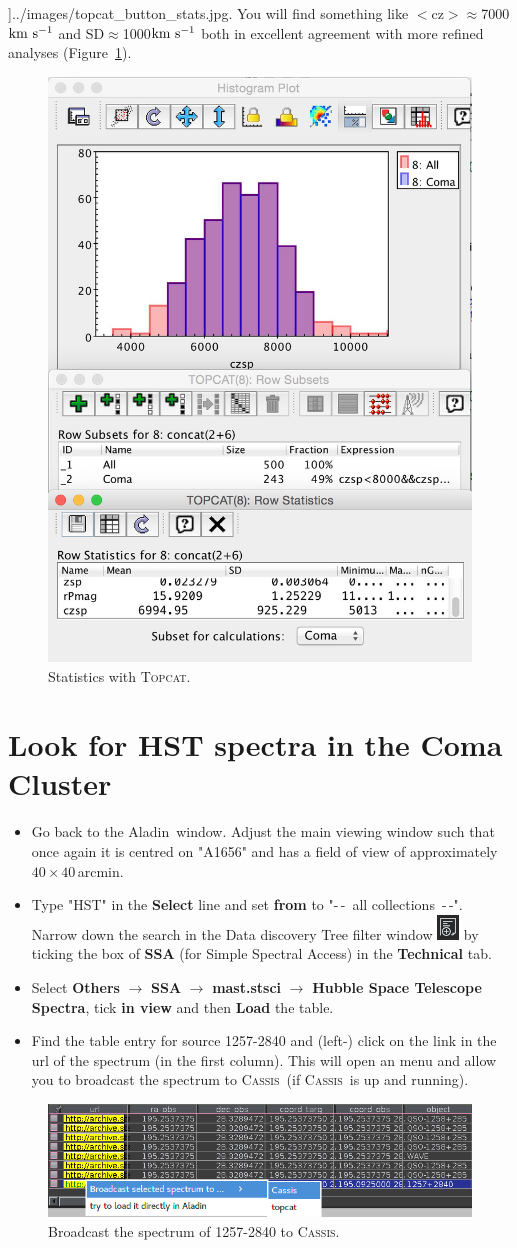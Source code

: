 \documentclass [a4paper, 12pt]{article}
\def\kms{\rm km\ s^{-1}}
\newcommand{\aladin}{{\textsc{A}{ladin}}}
\newcommand{\topcat}{{\textsc{Topcat}}}
\newcommand{\cassis}{{\textsc{Cassis}}}
\begin{document}
\begin{itemize}
\textwidth]{../images/topcat_button_stats.jpg}. You will find something like 
$<$cz$>\approx$7000$\kms$ and SD$\approx$1000$\kms$ both in excellent agreement 
with more refined analyses (Figure~\ref{fig:topstats}). 
\begin{figure}[H]
\center
\includegraphics[width=0.33  \textwidth]{../images/topcat_hist-stat_coma.jpg}
\caption{Statistics with \topcat.}
\label{fig:topstats}
\end{figure}
\end{itemize}

\section{Look for HST spectra in the Coma Cluster}

\begin{itemize}
\item Go back to the \aladin\ window. Adjust the main viewing window such that 
once again it is centred on "A1656" and has a field of view of approximately 
$40\times40$\,arcmin. 
\item Type "HST" in the \textbf{Select} line and set \textbf{from} to "-\,-~all 
collections~-\,-". Narrow down the search in the Data discovery Tree filter 
window \includegraphics[width=0.03 
\textwidth]{../images/aladin_button_filtertree.png} by ticking the box of 
\textbf{SSA} (for Simple Spectral Access) in the \textbf{Technical} tab. 
\item Select \textbf{Others} $\rightarrow$ \textbf{SSA} $\rightarrow$ 
\textbf{mast.stsci} $\rightarrow$ \textbf{Hubble Space Telescope Spectra}, tick 
\textbf{in view} and then \textbf{Load} the table. 
\item Find the table entry for source 1257-2840 and (left-) click on the link 
in the url of the spectrum (in the first column). This will open an menu and 
allow you to broadcast the spectrum to \cassis\ (if \cassis\ is up and 
running). 
\end{itemize}
\begin{figure}[H]
    \center
    \includegraphics[width=0.6  
    \textwidth]{../images/aladin_send_HSTspec_cassis.png}
    \caption{Broadcast the spectrum of 1257-2840 to \cassis.}
    \label{fig:broadcastspectrum}
\end{figure}
\end{document}
